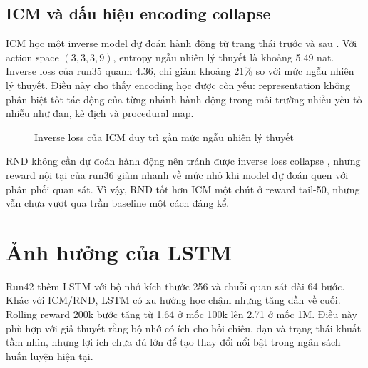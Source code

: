 \subsection{ICM và dấu hiệu encoding collapse}

ICM học một inverse model dự đoán hành động từ trạng thái trước và sau \cite{Pathak2017}. Với action space $(3,3,3,9)$, entropy ngẫu nhiên lý thuyết là khoảng 5.49 nat. Inverse loss của run35 quanh 4.36, chỉ giảm khoảng 21\% so với mức ngẫu nhiên lý thuyết. Điều này cho thấy encoding học được còn yếu: representation không phân biệt tốt tác động của từng nhánh hành động trong môi trường nhiều yếu tố nhiễu như đạn, kẻ địch và procedural map.

\begin{figure}[H]
    \centering
    \caption{Inverse loss của ICM duy trì gần mức ngẫu nhiên lý thuyết}
    \label{fig:icm_inverse_plateau}
\end{figure}

RND không cần dự đoán hành động nên tránh được inverse loss collapse \cite{Burda2018}, nhưng reward nội tại của run36 giảm nhanh về mức nhỏ khi model dự đoán quen với phân phối quan sát. Vì vậy, RND tốt hơn ICM một chút ở reward tail-50, nhưng vẫn chưa vượt qua trần baseline một cách đáng kể.

\section{Ảnh hưởng của LSTM}

Run42 thêm LSTM với bộ nhớ kích thước 256 và chuỗi quan sát dài 64 bước. Khác với ICM/RND, LSTM có xu hướng học chậm nhưng tăng dần về cuối. Rolling reward 200k bước tăng từ 1.64 ở mốc 100k lên 2.71 ở mốc 1M. Điều này phù hợp với giả thuyết rằng bộ nhớ có ích cho hồi chiêu, đạn và trạng thái khuất tầm nhìn, nhưng lợi ích chưa đủ lớn để tạo thay đổi nổi bật trong ngân sách huấn luyện hiện tại.

